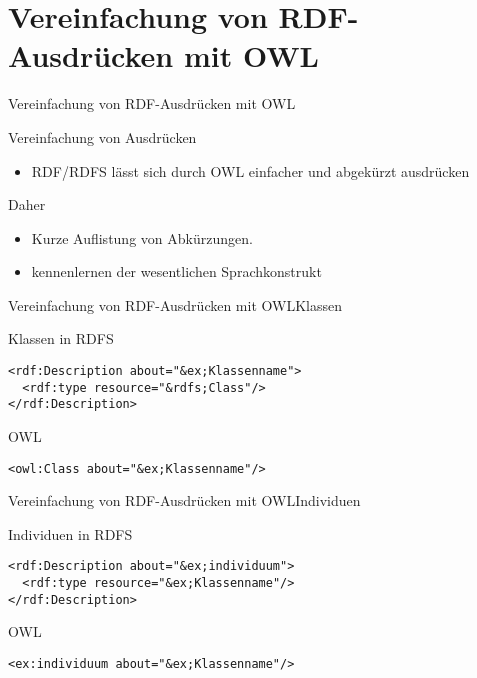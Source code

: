 \documentclass{beamer}
\begin{document}
\section{Vereinfachung von RDF-Ausdrücken mit OWL}
\begin{frame}[fragile]{Vereinfachung von RDF-Ausdrücken mit
OWL}
\begin{block}{Vereinfachung von Ausdrücken}
\begin{itemize}
\item RDF/RDFS lässt sich durch OWL einfacher und abgekürzt ausdrücken
\end{itemize}
\end{block}

\begin{block}{Daher}
\begin{itemize}
\item Kurze Auflistung von Abkürzungen.
\item kennenlernen der wesentlichen Sprachkonstrukt
\end{itemize}
\end{block}


\end{frame}
\begin{frame}[fragile]{Vereinfachung von RDF-Ausdrücken mit
OWL}{Klassen}
\begin{block}{Klassen in RDFS}
\begin{lstlisting}[lang="xml"]
<rdf:Description about="&ex;Klassenname">
  <rdf:type resource="&rdfs;Class"/>
</rdf:Description>
\end{lstlisting}
\end{block}
\begin{block}{OWL}
\begin{lstlisting}[lang="xml"]
<owl:Class about="&ex;Klassenname"/>
\end{lstlisting}
\end{block}

\end{frame}

\begin{frame}[fragile]{Vereinfachung von RDF-Ausdrücken mit
OWL}{Individuen}
\begin{block}{Individuen in RDFS}
\begin{lstlisting}[lang="xml"]
<rdf:Description about="&ex;individuum">
  <rdf:type resource="&ex;Klassenname"/>
</rdf:Description>
\end{lstlisting}
\end{block}
\begin{block}{OWL}
\begin{lstlisting}[lang="xml"]
<ex:individuum about="&ex;Klassenname"/>
\end{lstlisting}
\end{block}
\end{frame}
\end{document}

